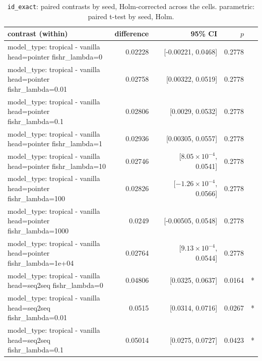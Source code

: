 \documentclass[10pt]{article}
\makeatletter
\newcommand{\stackcell}[1]{\begin{tabular}[t]{@{}l@{}}#1\end{tabular}}
\makeatother
\begin{document}
{\small
\begin{longtable}{lrrrl}
\caption{\texttt{id\_exact}: paired contrasts by seed, Holm-corrected across the cells. parametric: paired t-test by seed, Holm.}\label{tab:paired-id_exact}\\
\toprule
contrast (within) & difference & 95\% CI & $p$ & \\
\midrule
\endhead
\stackcell{model\_type: tropical - vanilla\\\footnotesize head=pointer fishr\_lambda=0 } & 0.02228 & [-0.00221, 0.0468] & 0.2778 & \\
\stackcell{model\_type: tropical - vanilla\\\footnotesize head=pointer fishr\_lambda=0.01 } & 0.02758 & [0.00322, 0.0519] & 0.2778 & \\
\stackcell{model\_type: tropical - vanilla\\\footnotesize head=pointer fishr\_lambda=0.1 } & 0.02806 & [0.0029, 0.0532] & 0.2778 & \\
\stackcell{model\_type: tropical - vanilla\\\footnotesize head=pointer fishr\_lambda=1 } & 0.02936 & [0.00305, 0.0557] & 0.2778 & \\
\stackcell{model\_type: tropical - vanilla\\\footnotesize head=pointer fishr\_lambda=10 } & 0.02746 & [$8.05\times10^{-4}$, 0.0541] & 0.2778 & \\
\stackcell{model\_type: tropical - vanilla\\\footnotesize head=pointer fishr\_lambda=100 } & 0.02826 & [$-1.26\times10^{-4}$, 0.0566] & 0.2778 & \\
\stackcell{model\_type: tropical - vanilla\\\footnotesize head=pointer fishr\_lambda=1000 } & 0.0249 & [-0.00505, 0.0548] & 0.2778 & \\
\stackcell{model\_type: tropical - vanilla\\\footnotesize head=pointer fishr\_lambda=1e+04 } & 0.02764 & [$9.13\times10^{-4}$, 0.0544] & 0.2778 & \\
\stackcell{model\_type: tropical - vanilla\\\footnotesize head=seq2seq fishr\_lambda=0 } & 0.04806 & [0.0325, 0.0637] & 0.0164 & *\\
\stackcell{model\_type: tropical - vanilla\\\footnotesize head=seq2seq fishr\_lambda=0.01 } & 0.0515 & [0.0314, 0.0716] & 0.0267 & *\\
\stackcell{model\_type: tropical - vanilla\\\footnotesize head=seq2seq fishr\_lambda=0.1 } & 0.05014 & [0.0275, 0.0727] & 0.0423 & *\\

\end{longtable}}
\end{document}
